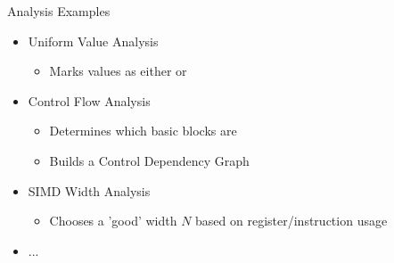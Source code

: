 \begin{frame}{Analysis Examples}

\begin{itemize}
    \item Uniform Value Analysis
    \begin{itemize}
        \item Marks values as either  or 
    \end{itemize}

    \item Control Flow Analysis
    \begin{itemize}
        \item Determines which basic blocks are 
        \item Builds a Control Dependency Graph
    \end{itemize}
    
    \item SIMD Width Analysis
    \begin{itemize}
        \item Chooses a 'good' width $N$ based on register/instruction usage
    \end{itemize}
    
    \item ...
\end{itemize}

\end{frame}



